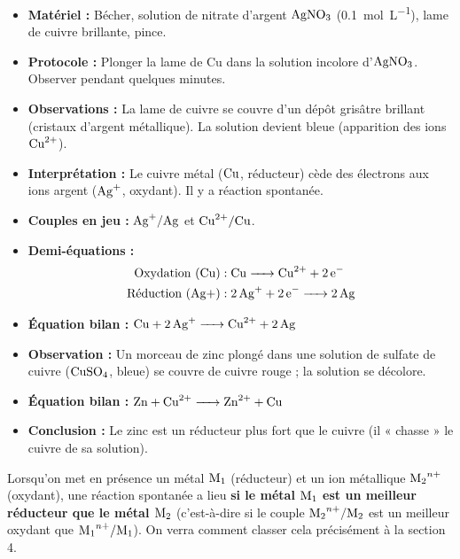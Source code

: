 \documentclass[11pt]{article}
\begin{document}
\begin{experience}
\begin{itemize}
  \item \textbf{Matériel :} Bécher, solution de nitrate d'argent $\ce{AgNO3}$ (\SI{0,1}{mol.L^{-1}}), lame de cuivre brillante, pince.
  \item \textbf{Protocole :} Plonger la lame de Cu dans la solution incolore d'$\ce{AgNO3}$. Observer pendant quelques minutes.
  \item \textbf{Observations :} La lame de cuivre se couvre d'un dépôt grisâtre brillant (cristaux d'argent métallique). La solution devient bleue (apparition des ions $\ce{Cu^2+}$).
  \item \textbf{Interprétation :} Le cuivre métal ($\ce{Cu}$, réducteur) cède des électrons aux ions argent ($\ce{Ag+}$, oxydant). Il y a réaction spontanée.
  \item \textbf{Couples en jeu :} $\ce{Ag+}/\ce{Ag}$ et $\ce{Cu^2+}/\ce{Cu}$.
  \item \textbf{Demi-équations :}
  \begin{align*}
    \text{Oxydation (Cu)} &: \ce{Cu -> Cu^2+ + 2e-} \\
    \text{Réduction (Ag+)} &: \ce{2Ag+ + 2e- -> 2Ag}
  \end{align*}
  \item \textbf{Équation bilan :} $\ce{Cu + 2Ag+ -> Cu^2+ + 2Ag}$
\end{itemize}
\end{experience}

\begin{experience}[Réaction $\ce{Zn} + \ce{Cu^2+}$]
\begin{itemize}
  \item \textbf{Observation :} Un morceau de zinc plongé dans une solution de sulfate de cuivre ($\ce{CuSO4}$, bleue) se couvre de cuivre rouge ; la solution se décolore.
  \item \textbf{Équation bilan :} $\ce{Zn + Cu^2+ -> Zn^2+ + Cu}$
  \item \textbf{Conclusion :} Le zinc est un réducteur plus fort que le cuivre (il « chasse » le cuivre de sa solution).
\end{itemize}
\end{experience}

\begin{propriete}
Lorsqu'on met en présence un métal $\ce{M_1}$ (réducteur) et un ion métallique $\ce{M_2^{n+}}$ (oxydant), une réaction spontanée a lieu \textbf{si le métal $\ce{M_1}$ est un meilleur réducteur que le métal $\ce{M_2}$} (c'est-à-dire si le couple $\ce{M_2^{n+}}/\ce{M_2}$ est un meilleur oxydant que $\ce{M_1^{n+}}/\ce{M_1}$). On verra comment classer cela précisément à la section 4.
\end{propriete}
\end{document}
